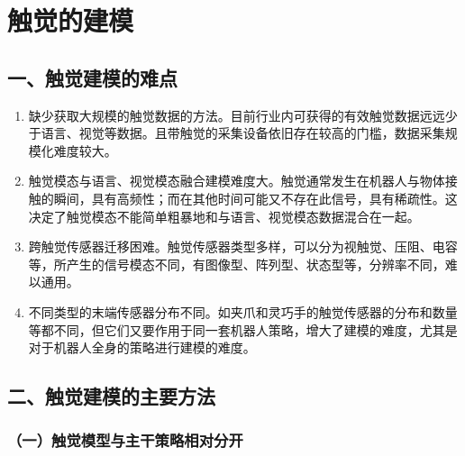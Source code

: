 \setcounter{section}{3}

\hypertarget{ux89e6ux89c9ux7684ux5efaux6a21}{%
\section{触觉的建模}\label{ux89e6ux89c9ux7684ux5efaux6a21}}

\hypertarget{ux4e00ux89e6ux89c9ux5efaux6a21ux7684ux96beux70b9}{%
\subsection{一、触觉建模的难点}\label{ux4e00ux89e6ux89c9ux5efaux6a21ux7684ux96beux70b9}}

\begin{enumerate}
\def\labelenumi{\arabic{enumi}.}
\item
  缺少获取大规模的触觉数据的方法。目前行业内可获得的有效触觉数据远远少于语言、视觉等数据。且带触觉的采集设备依旧存在较高的门槛，数据采集规模化难度较大。
\item
  触觉模态与语言、视觉模态融合建模难度大。触觉通常发生在机器人与物体接触的瞬间，具有高频性；而在其他时间可能又不存在此信号，具有稀疏性。这决定了触觉模态不能简单粗暴地和与语言、视觉模态数据混合在一起。
\item
  跨触觉传感器迁移困难。触觉传感器类型多样，可以分为视触觉、压阻、电容等，所产生的信号模态不同，有图像型、阵列型、状态型等，分辨率不同，难以通用。
\item
  不同类型的末端传感器分布不同。如夹爪和灵巧手的触觉传感器的分布和数量等都不同，但它们又要作用于同一套机器人策略，增大了建模的难度，尤其是对于机器人全身的策略进行建模的难度。
\end{enumerate}

\hypertarget{ux4e8cux89e6ux89c9ux5efaux6a21ux7684ux4e3bux8981ux65b9ux6cd5}{%
\subsection{二、触觉建模的主要方法}\label{ux4e8cux89e6ux89c9ux5efaux6a21ux7684ux4e3bux8981ux65b9ux6cd5}}

\hypertarget{ux4e00ux89e6ux89c9ux6a21ux578bux4e0eux4e3bux5e72ux7b56ux7565ux76f8ux5bf9ux5206ux5f00}{%
\subsubsection{（一）触觉模型与主干策略相对分开}\label{ux4e00ux89e6ux89c9ux6a21ux578bux4e0eux4e3bux5e72ux7b56ux7565ux76f8ux5bf9ux5206ux5f00}}

